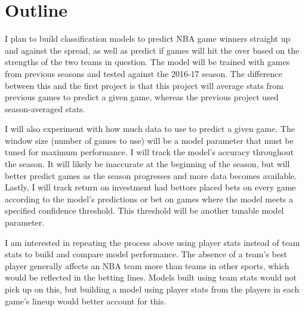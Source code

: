 \documentclass{article}
\begin{document}
\section{Outline}

I plan to build classification models to predict NBA game winners straight up and against the spread, as well as predict if games will hit the over based on the strengths of the two teams in question. The model will be trained with games from previous seasons and tested against the 2016-17 season. The difference between this and the first project is that this project will average stats from previous games to predict a given game, whereas the previous project used season-averaged stats.

I will also experiment with how much data to use to predict a given game. The window size (number of games to use) will be a model parameter that must be tuned for maximum performance. I will track the model's accuracy throughout the season. It will likely be inaccurate at the beginning of the season, but will better predict games as the season progresses and more data becomes available. Lastly, I will track return on investment had bettors placed bets on every game according to the model's predictions or bet on games where the model meets a specified confidence threshold. This threshold will be another tunable model parameter.

I am interested in repeating the process above using player stats instead of team stats to build and compare model performance. The absence of a team's best player generally affects an NBA team more than teams in other sports, which would be reflected in the betting lines. Models built using team stats would not pick up on this, but building a model using player stats from the players in each game's lineup would better account for this.

\printbibliography
\end{document}
